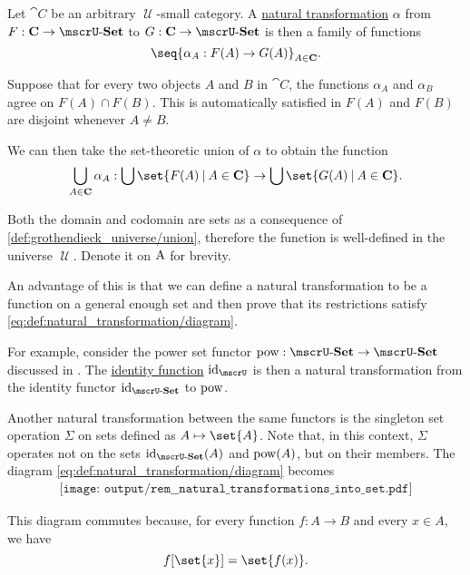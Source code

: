 \begin{remark}\label{rem:natural_transformations_into_set}
  Let \( \cat{C} \) be an arbitrary \( \mscrU \)-small category. A \hyperref[def:natural_transformation]{natural transformation} \( \alpha \) from \( F: \cat{C} \to \ucat{Set} \) to \( G: \cat{C} \to \ucat{Set} \) is then a family of functions
  \begin{equation*}
    \seq{ \alpha_A: F(A) \to G(A) }_{A \in \cat{C}}.
  \end{equation*}

  Suppose that for every two objects \( A \) and \( B \) in \( \cat{C} \), the functions \( \alpha_A \) and \( \alpha_B \) agree on \( F(A) \cap F(B) \). This is automatically satisfied in \( F(A) \) and \( F(B) \) are disjoint whenever \( A \neq B \).

  We can then take the set-theoretic union of \( \alpha \) to obtain the function
  \begin{equation*}
    \bigcup_{A \in \cat{C}} \alpha_A: \bigcup\set{ F(A) \given A \in \cat{C} } \to \bigcup\set{ G(A) \given A \in \cat{C} }.
  \end{equation*}

  Both the domain and codomain are sets as a consequence of \ref{def:grothendieck_universe/union}, therefore the function is well-defined in the universe \( \mscrU \). Denote it on \( \operatorname{A} \) for brevity.

  An advantage of this is that we can define a natural transformation to be a function on a general enough set and then prove that its restrictions satisfy \eqref{eq:def:natural_transformation/diagram}.

  For example, consider the power set functor \( \pow: \ucat{Set} \to \ucat{Set} \) discussed in . The \hyperref[def:multi_valued_function/identity]{identity function} \( \id_\mscrU \) is then a natural transformation from the identity functor \( \id_{\ucat{Set}} \) to \( \operatorname{pow} \).

  Another natural transformation between the same functors is the singleton set operation \( \Sigma \) on sets defined as \( A \mapsto \set{ A } \). Note that, in this context, \( \Sigma \) operates not on the sets \( \id_{\ucat{Set}}(A) \) and \( \operatorname{pow}(A) \), but on their members. The diagram \eqref{eq:def:natural_transformation/diagram} becomes
  \begin{equation}\label{eq:rem:natural_transformations_into_set}
    \begin{aligned}
      \texttt{[image: output/rem\_\_natural\_transformations\_into\_set.pdf]}
    \end{aligned}
  \end{equation}

  This diagram commutes because, for every function \( f: A \to B \) and every \( x \in A \), we have
  \begin{equation*}
    f[\set{ x }] = \set{ f(x) }.
  \end{equation*}
\end{remark}

